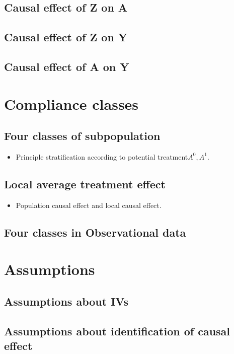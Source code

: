 \subsection{Causal effect of Z on A}
\subsection{Causal effect of Z on Y}
\subsection{Causal effect of A on Y}


\section{Compliance classes}
\subsection{Four classes of subpopulation}
\begin{itemize}
	\item Principle stratification according to potential treatment$A^0,A^1$.
\end{itemize}

\subsection{Local average treatment effect}
\begin{itemize}
	\item Population causal effect and local causal effect.
\end{itemize}

\subsection{Four classes in Observational data}

\section{Assumptions}
\subsection{Assumptions about IVs}
\subsection{Assumptions about identification of causal effect}

